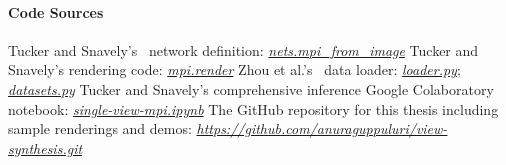 \paragraph{Code Sources}\label{sec:code-sources}

\begin{outline}
    \1 Tucker and Snavely's~\cite{single_view_mpi} network definition: \href{https://github.com/google-research/google-research/blob/ea313c6e96acce6c863de41615c6cf4079b8ca94/single_view_mpi/libs/nets.py#L146}{\textit{nets.mpi\_from\_image}}
    \1 Tucker and Snavely's rendering code: \href{https://github.com/google-research/google-research/blob/ea313c6e96acce6c863de41615c6cf4079b8ca94/single_view_mpi/libs/mpi.py#L232}{\textit{mpi.render}}
    \1 Zhou et al.'s~\cite{zhou2018stereo} data loader: \href{https://github.com/google/stereo-magnification/blob/f2041f80ed8c340173a6048375ba900201c1f1e7/stereomag/loader.py}{\textit{loader.py}}; \href{https://github.com/google/stereo-magnification/blob/f2041f80ed8c340173a6048375ba900201c1f1e7/stereomag/datasets.py}{\textit{datasets.py}}
    \1 Tucker and Snavely's comprehensive inference Google Colaboratory notebook: \href{https://colab.research.google.com/github/google-research/google-research/blob/master/single_view_mpi/example.ipynb}{\textit{single-view-mpi.ipynb}}
    \1 The GitHub repository for this thesis including sample renderings and demos: \href{https://github.com/anuraguppuluri/view-synthesis.git}{\textit{https://github.com/anuraguppuluri/view-synthesis.git}}
\end{outline}
